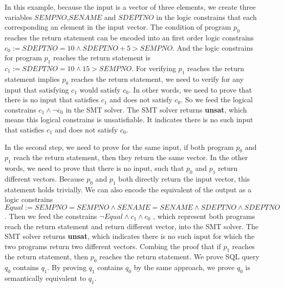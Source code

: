 %
In this example, because the input is a vector of three elements, we create three variables $SEMPNO$,$SENAME$ and 
$SDEPTNO$ in the logic constrains that each 
corresponding an element in the input vector.
%
The condition of program $p_0$ reaches the return statement can be encoded into an first order logic constrains \\
$c_0 := SDEPTNO = 10 \land SDEPTNO + 5 > SEMPNO$.
%
And the logic constrains for program $p_1$ reaches the return statement is $c_1 := SDEPTNO = 10 \land 15 > SEMPNO$.
%
For verifying $p_1$ reaches the return statement implies $p_0$ reaches the return statement, 
we need to verify for any input that satisfying $c_1$ would satisfy $c_0$.
%
In other words, we need to prove that there is no input that satisfies $c_1$ and does not satisfy $c_0$.
%
So we feed the logical constrains $c_1 \land \neg c_0$ in the SMT solver. 
%
The SMT solver returns \textbf{unsat}, which means this logical constrains is unsatisfiable.
%
It indicates there is no such input that satisfies $c_1$ and does not satisfy $c_0$.

%
In the second step, we need to prove for the same input, if both program $p_0$ and $p_1$ reach the return statement,
then they return the same vector.
%
In the other words, we need to prove that there is no input, such that $p_0$ and $p_1$ return different vectors.
%
Because $p_0$ and $p_1$ both directly return the input vector, this statement holds trivially.
%
We can also encode the equivalent of the output as a logic constrains $Equal := SEMPNO = SEMPNO \land SENAME = 
SENAME \land  SDEPTNO \land SDEPTNO$.
%
Then we feed the constrains $\neg Equal \land c_1 \land c_0$ , which represent both programs reach the return 
statement and return different vector, 
into the SMT solver.
%
The SMT solver returns \textbf{unsat}, which indicates there is no such input for which the two programs return two 
different vectors.
%
Combing the proof that if $p_1$ reaches the return statement, then $p_0$ reaches the return statement.
%
We prove SQL query $q_0$ contains $q_1$.
%
By proving $q_1$ contains $q_0$ by the same approach, we prove $q_0$ is semantically equivalent to $q_1$.

